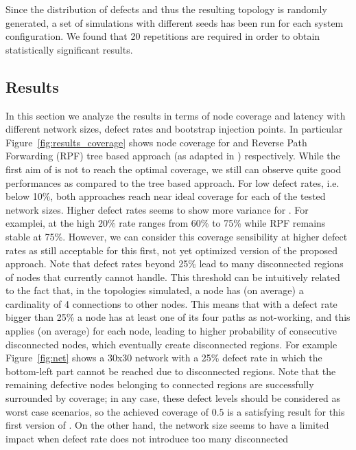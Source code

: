 Since the distribution of defects and thus the resulting topology is randomly
generated, a set of simulations with different seeds has been run
for each system configuration. We found that 20 repetitions are
required in order to obtain statistically significant results.


\subsection{Results}
\label{sec:results}

In this section we analyze the results in terms of node coverage and
latency with different network sizes, defect rates and bootstrap
injection points. In particular Figure~\ref{fig:results_coverage}
shows node coverage for \disr{} and Reverse Path Forwarding (RPF) tree
based approach (as adapted in \cite{patwardhan_nanoarch06}) respectively. 
While the first aim of \disr{} is not to
reach the optimal coverage, we still can observe quite good
performances as compared to the tree based approach. For low defect
rates, i.e. below 10\%, both approaches reach near ideal coverage for
each of the tested network sizes. Higher defect rates seems to show
more variance for \disr{}. For examplei, at the high 20\% rate \disr{}
ranges from 60\% to 75\% while RPF remains stable at 75\%. However, we
can consider this coverage sensibility at higher defect rates as still acceptable
for this first, not yet optimized version of the proposed approach.
Note that defect rates beyond 25\% lead to many disconnected
regions of nodes that \disr{} currently cannot handle. This threshold can be
intuitively related to the fact that, in the topologies simulated, a
node has (on average) a cardinality of 4 connections to other nodes. This means
that with a defect rate bigger than 25\% a node has at least one of its four
paths as not-working, and this applies (on average) for each node,
leading to higher probability of consecutive disconnected
nodes, which eventually create disconnected regions. For example Figure~\ref{fig:net} shows a 30x30 network with a 25\%
defect rate in which the bottom-left part cannot be reached due to
disconnected regions. Note that the remaining defective nodes belonging to
connected regions are successfully surrounded by \disr{} coverage; in any
case, these defect levels should be considered as worst case scenarios, so the
achieved coverage of $0.5$ is a satisfying result for this first
version of \disr{}. On the other hand, the network size seems to have a
limited impact when defect rate does not introduce too many disconnected
